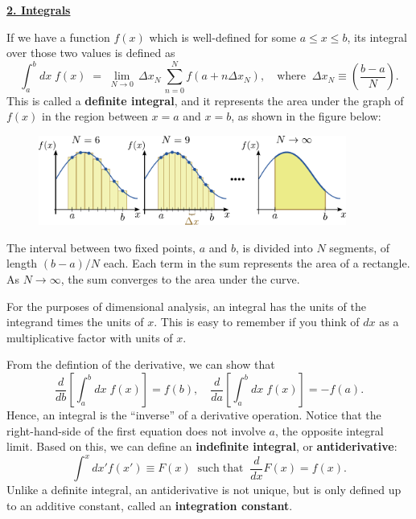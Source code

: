 \documentclass[10pt,a4paper]{article}
\begin{document}
\setcounter{page}{13}
\noindent
\underline{\textbf{\LARGE 2. Integrals}}
\vskip 0.1in

If we have a function $f(x)$ which is well-defined for some $a \le x
\le b$, its integral over those two values is defined as
\begin{equation}
  \int_a^b dx\; f(x) \;=\; \lim_{N \rightarrow 0} \, \Delta x_N\, \sum_{n=0}^{N} f(a + n\Delta x_N), \quad\mathrm{where}\;\; \Delta x_N \equiv \left(\frac{b-a}{N}\right).
\end{equation}
This is called a \textbf{definite integral}, and it represents the area
under the graph of $f(x)$ in the region between $x=a$ and $x=b$,
as shown in the figure below:

\begin{figure}[h]
  \centering\includegraphics[width=0.9\textwidth]{definite_integral}
\end{figure}

\noindent
The interval between two fixed points, $a$ and $b$, is divided into
$N$ segments, of length $(b-a)/N$ each. Each term in the sum
represents the area of a rectangle. As $N\rightarrow \infty$, the sum
converges to the area under the curve.

For the purposes of dimensional analysis, an integral has the units of
the integrand times the units of $x$. This is easy to remember if you
think of $dx$ as a multiplicative factor with units of $x$.

From the defintion of the derivative, we can show that
\begin{equation}
  \frac{d}{db} \left[\int_a^b dx\; f(x)\right] = f(b), \quad \frac{d}{da} \left[\int_a^b dx\; f(x)\right] = -f(a).
\end{equation}
Hence, an integral is the ``inverse'' of a derivative operation. Notice
that the right-hand-side of the first equation does not involve $a$,
the opposite integral limit. Based on this, we can define an
\textbf{indefinite integral}, or \textbf{antiderivative}:
\begin{equation}
  \int^x dx' f(x') \equiv F(x) \;\;\mathrm{such}\;\mathrm{that}\;\; \frac{d}{dx}F(x) = f(x).
\end{equation}
Unlike a definite integral, an antiderivative is not unique, but is
only defined up to an additive constant, called an \textbf{integration
  constant}.
\end{document}
